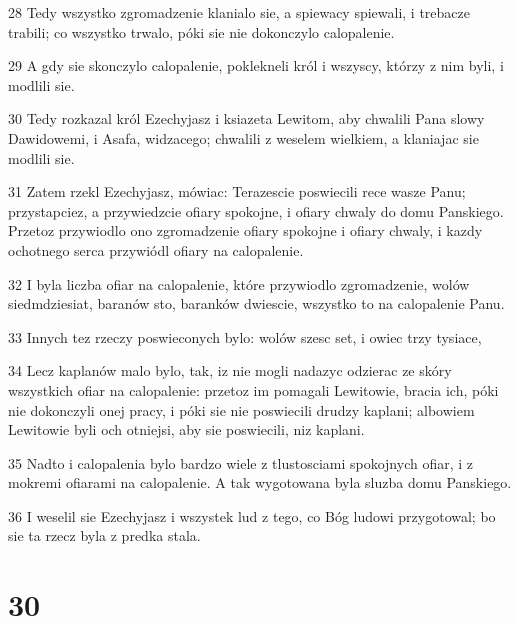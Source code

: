 \par 28 Tedy wszystko zgromadzenie klanialo sie, a spiewacy spiewali, i trebacze trabili; co wszystko trwalo, póki sie nie dokonczylo calopalenie.
\par 29 A gdy sie skonczylo calopalenie, poklekneli król i wszyscy, którzy z nim byli, i modlili sie.
\par 30 Tedy rozkazal król Ezechyjasz i ksiazeta Lewitom, aby chwalili Pana slowy Dawidowemi, i Asafa, widzacego; chwalili z weselem wielkiem, a klaniajac sie modlili sie.
\par 31 Zatem rzekl Ezechyjasz, mówiac: Terazescie poswiecili rece wasze Panu; przystapciez, a przywiedzcie ofiary spokojne, i ofiary chwaly do domu Panskiego. Przetoz przywiodlo ono zgromadzenie ofiary spokojne i ofiary chwaly, i kazdy ochotnego serca przywiódl ofiary na calopalenie.
\par 32 I byla liczba ofiar na calopalenie, które przywiodlo zgromadzenie, wolów siedmdziesiat, baranów sto, baranków dwiescie, wszystko to na calopalenie Panu.
\par 33 Innych tez rzeczy poswieconych bylo: wolów szesc set, i owiec trzy tysiace,
\par 34 Lecz kaplanów malo bylo, tak, iz nie mogli nadazyc odzierac ze skóry wszystkich ofiar na calopalenie: przetoz im pomagali Lewitowie, bracia ich, póki nie dokonczyli onej pracy, i póki sie nie poswiecili drudzy kaplani; albowiem Lewitowie byli och otniejsi, aby sie poswiecili, niz kaplani.
\par 35 Nadto i calopalenia bylo bardzo wiele z tlustosciami spokojnych ofiar, i z mokremi ofiarami na calopalenie. A tak wygotowana byla sluzba domu Panskiego.
\par 36 I weselil sie Ezechyjasz i wszystek lud z tego, co Bóg ludowi przygotowal; bo sie ta rzecz byla z predka stala.

\chapter{30}

